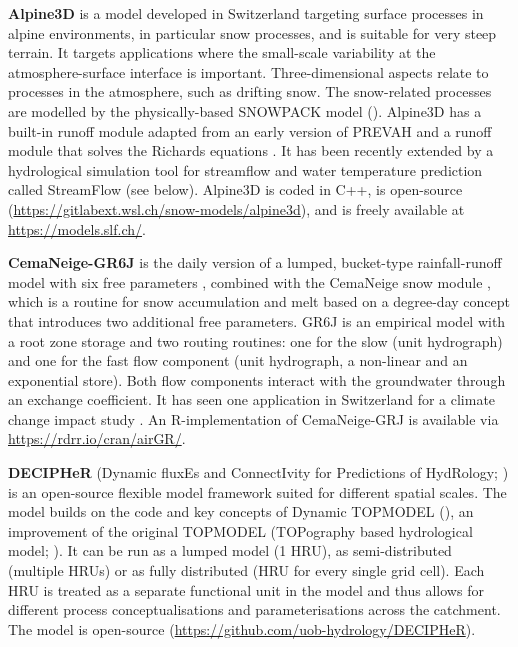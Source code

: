 \documentclass[10pt,a4paper]{article}
\begin{document}
\textbf{Alpine3D} \citep{Lehning2006} is a model developed in Switzerland targeting surface processes in alpine environments, in particular snow processes, and is suitable for very steep terrain. It targets applications where the small-scale variability at the atmosphere-surface interface is important. Three-dimensional aspects relate to processes in the atmosphere, such as drifting snow. The snow-related processes are modelled by the physically-based SNOWPACK model (\citealt{Bartelt2002, Lehning2002a, Lehning2002b}). Alpine3D has a built-in runoff module adapted from an early version of PREVAH \citep{Lehning2006} and a runoff module that solves the Richards equations \citep{Wever2017}. It has been recently extended by a hydrological simulation tool for streamflow and water temperature prediction called StreamFlow (see below). Alpine3D is coded in C++, is open-source (\url{https://gitlabext.wsl.ch/snow-models/alpine3d}), and is freely available at \url{https://models.slf.ch/}.

\textbf{CemaNeige-GR6J} is the daily version of a lumped, bucket-type rainfall-runoff model with six free parameters \citep{Pushpalatha2011}, combined with the CemaNeige snow module \citep{Valery2014a, Valery2014b}, which is a routine for snow accumulation and melt based on a degree-day concept that introduces two additional free parameters. GR6J is an empirical model with a root zone storage and two routing routines: one for the slow (unit hydrograph) and one for the fast flow component ({unit hydrograph}, a non-linear and an exponential store). Both flow components interact with the groundwater through an exchange coefficient. It has seen one application in Switzerland for a climate change impact study \citep{Keller2019a}. An R-implementation of CemaNeige-GRJ is available via \url{https://rdrr.io/cran/airGR/}.

\textbf{DECIPHeR} (Dynamic fluxEs and ConnectIvity for Predictions of HydRology; \citealp{Coxon2019}) is an open-source flexible model framework suited for different spatial scales. The model builds on the code and key concepts of Dynamic TOPMODEL (\citealp{Beven2001}), an improvement of the original TOPMODEL (TOPography based hydrological model; \citealp{Beven1979}). It can be run as a lumped model (1 HRU), as semi-distributed (multiple HRUs) or as fully distributed (HRU for every single grid cell). Each HRU is treated as a separate functional unit in the model and thus allows for different process conceptualisations and parameterisations across the catchment. The model is open-source (\url{https://github.com/uob-hydrology/DECIPHeR}).
\end{document}
